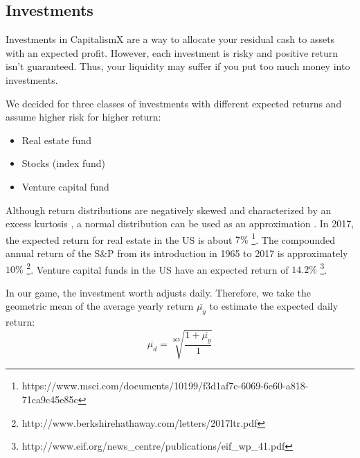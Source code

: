 \subsection{Investments}
\label{sec:investments_simulation}

 Investments in CapitalismX are a way to allocate your residual cash to assets with an expected profit. However, each investment is risky and positive return isn't guaranteed. Thus, your liquidity may suffer if you put too much money into investments.
  
  We decided for three classes of investments with different expected returns and assume higher risk for higher return:
\begin{itemize}
	\item Real estate fund
	\item Stocks (index fund)
	\item Venture capital fund
\end{itemize}

Although return distributions are negatively skewed and characterized by an excess kurtosis \cite{ANDERSEN200143}, a normal distribution can be used as an approximation \cite{doi:10.1080/01621459.1972.10481297}. In 2017, the expected return for real estate in the US is about $7\%$ \footnote{https://www.msci.com/documents/10199/f3d1af7c-6069-6e60-a818-71ca9c45e85c}. The compounded annual return of the S\&P from its introduction in 1965 to 2017 is approximately $10\%$ \footnote{http://www.berkshirehathaway.com/letters/2017ltr.pdf}. Venture capital funds in the US have an expected return of $14.2\%$ \footnote{http://www.eif.org/news\_centre/publications/eif\_wp\_41.pdf}.

In our game, the investment worth adjusts daily. Therefore, we take the geometric mean of the average yearly return $\overline{\mu_y}$ to estimate the expected daily return:
\begin{equation}
	\overline{\mu_d} = \sqrt[365]{\frac{1 + \overline{\mu_y}}{1}}
\end{equation}

